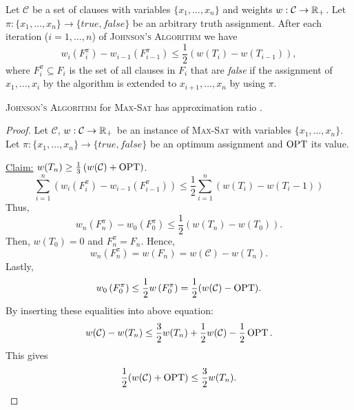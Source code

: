\documentclass[../skript.tex]{subfiles}
\begin{document}
\begin{lemma} %
\label{thm:28}
Let $\mathcal{C}$ be a set of clauses with variables $\{ x_1, \ldots, x_n \}$ and weights $w : \mathcal{C} \to \mathbb{R}_+$. Let $\pi : \{ x_1, \ldots, x_n\} \to \{ \textit{true}, \textit{false} \}$ be an arbitrary truth assignment.
After each iteration ($i = 1, \ldots, n$) of \textsc{Johnson's Algorithm} we have
\[
	w_i\left( F_i^\pi \right) - w_{i-1} \left( F_{i-1}^\pi \right) \leq \frac{1}{2} \left( w(T_i) - w(T_{i-1}) \right),
\]
where $F_i^\pi \subseteq F_i$ is the set of all clauses in $F_i$ that are \textit{false} if the assignment of $x_1, \ldots, x_i$ by the algorithm is extended to $x_{i+1}, \ldots, x_n$ by using $\pi$.
\end{lemma}
\begin{theorem} %
\label{thm:29}
\textsc{Johnson's Algorithm} for \textsc{Max-Sat} has approximation ratio . 
\end{theorem}
\begin{proof}
Let $\mathcal{C}$, $w : \mathcal{C} \to \mathbb{R}_+$ be an instance of \textsc{Max-Sat} with variables $\{ x_1, \ldots, x_n \}$. Let $\pi : \{ x_1, \ldots, x_n\} \to \{ \textit{true}, \textit{false} \}$ be an optimum assignment and $\operatorname{OPT}$ its value.

\underline{Claim:} $w(T_n) \geq \frac{1}{3} \left( w(\mathcal{C}) + \operatorname{OPT} \right)$.
\[
\sum_{i=1}^n \left( w_i \left(F_i^\pi \right) - w_{i-1} \left( F_{i-1}^\pi \right) \right) \leq \frac{1}{2} \sum_{i=1}^n \left( w(T_i) - w(T_i-1) \right)
\]
Thus,
\[
	w_n\left(F_n^\pi\right) - w_0\left(F_0^\pi\right) \leq \frac{1}{2} \left( w(T_n) - w(T_0) \right).
\]
Then, $w(T_0) = 0$ and $F_n^\pi = F_n$. Hence,
\[
	w_n \left( F_n^\pi \right) = w(F_n) = w(\mathcal{C}) - w(T_n).
\]
Lastly,
\[
	w_0 \left( F_0^\pi \right) \leq \frac{1}{2} w \left( F_0^\pi \right) = \frac{1}{2} (w(\mathcal{C}) - \operatorname{OPT}).
\]
By inserting these equalities into above equation:
\[
	w(\mathcal{C}) - w(T_n) \leq \frac{3}{2} w(T_n) + \frac{1}{2} w(\mathcal{C}) - \frac{1}{2} \operatorname{OPT}. 
\]
This gives
\[
	\frac{1}{2} ( w(\mathcal{C}) + \operatorname{OPT} ) \leq \frac{3}{2} w(T_n). 
\]
\end{proof}
\end{document}
